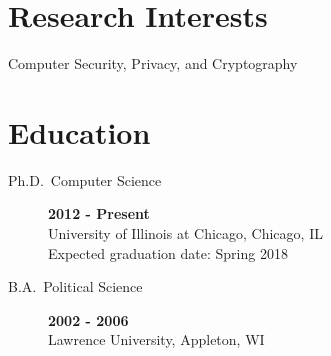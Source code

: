 \documentclass{vitae}
\author{Peter Snyder}
\begin{document}
  \maketitle

  \section{Research Interests}
  \begin{description}
    \item{Computer Security, Privacy, and Cryptography}
  \end{description}

  \section{Education}
  \begin{description}
    \item[Ph.D.~Computer Science] \hfill \textbf{2012 - Present}\\
    University of Illinois at Chicago, Chicago, IL\\
    Expected graduation date: Spring 2018

    \item[B.A.~Political Science] \hfill \textbf{2002 - 2006}~\\
    Lawrence University, Appleton, WI
  \end{description}

  
    \nocite{snyder2017cdf}
    \nocite{snyder2016browser}
    \nocite{snyder2015no}
    \nocite{clark2015saw}
    \nocite{snyder2014yao}
    \nocite{snyder2013cloudsweeper}
  
\end{document}
